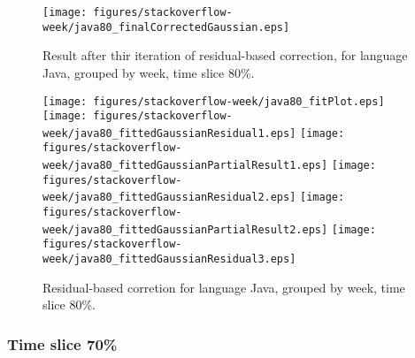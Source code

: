\begin{figure}[]
\centering
{\texttt{[image: figures/stackoverflow-week/java80\_finalCorrectedGaussian.eps]}}
\caption{Result after thir iteration of residual-based correction, for language Java, grouped by week, time slice 80\%.}
\end{figure}


\begin{figure}[hb]
\centering
{}
{\texttt{[image: figures/stackoverflow-week/java80\_fitPlot.eps]}}
{\texttt{[image: figures/stackoverflow-week/java80\_fittedGaussianResidual1.eps]}}
{\texttt{[image: figures/stackoverflow-week/java80\_fittedGaussianPartialResult1.eps]}}
{\texttt{[image: figures/stackoverflow-week/java80\_fittedGaussianResidual2.eps]}}
{\texttt{[image: figures/stackoverflow-week/java80\_fittedGaussianPartialResult2.eps]}}
{\texttt{[image: figures/stackoverflow-week/java80\_fittedGaussianResidual3.eps]}}
\caption{Residual-based corretion for language Java, grouped by week, time slice 80\%.}
\end{figure}


\clearpage 
\newpage 


\FloatBarrier

\subsubsection{Time slice 70\%}

